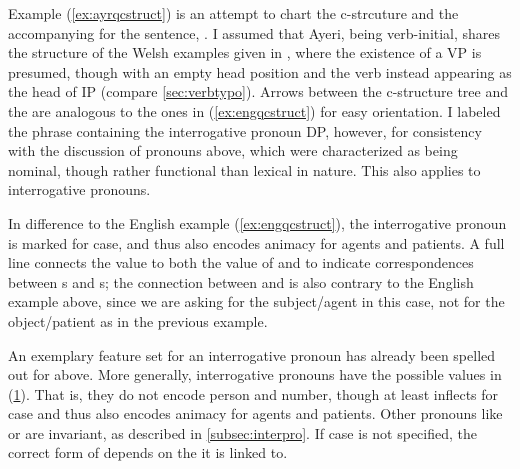 Example (\ref{ex:ayrqcstruct}) is an attempt to chart the c-strcuture and the
accompanying \Avm{} for the sentence, . I assumed that Ayeri, being
verb-initial, shares the structure of the Welsh examples given in
\textcites[66]{dalrymple2001}[130--135]{bresnan2016}, where the existence of a
VP is presumed, though with an empty head position and the verb instead
appearing as the head of IP (compare \autoref{sec:verbtypo}). Arrows between
the c-structure tree and the \Avm{} are analogous to the ones in
(\ref{ex:engqcstruct}) for easy orientation. I labeled the phrase containing
the interrogative pronoun DP, however, for consistency with the discussion of
pronouns above, which were characterized as being nominal, though rather
functional than lexical in nature. This also applies to interrogative pronouns.

In difference to the English example (\ref{ex:engqcstruct}), the interrogative
pronoun is marked for case, and thus also encodes animacy for agents and
patients. A full line connects the \Foc{} value to both the value of \Q{} and
\Subj{} to indicate correspondences between \DF{}s and \GF{}s; the connection
between \Foc{} and \Subj{} is also contrary to the English example above, since
we are asking for the subject/agent in this case, not for the object/patient as
in the previous example.

An exemplary feature set for an interrogative pronoun has already been spelled
out for  above. More generally, interrogative pronouns
have the possible values in (\ref{ex:interpromorphlex}). That is, they do not
encode person and number, though at least  inflects for case
and thus also encodes animacy for agents and patients. Other pronouns like
 or  are invariant, as
described in \autoref{subsec:interpro}. If case is not specified, the correct
form of  depends on the \GF{} it is linked to.

\begin{figure}[h]
\begin{morphlex}
\ex\label{ex:interpromorphlex}
\xe
\end{morphlex}
\end{figure}

